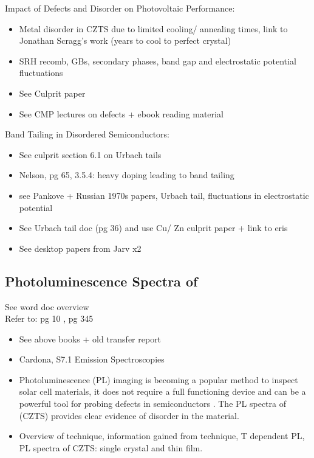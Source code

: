 Impact of Defects and Disorder on Photovoltaic Performance:
\begin{itemize}
\item Metal disorder in CZTS due to limited cooling/ annealing times, link to Jonathan Scragg's work (years to cool to perfect crystal)
\item SRH recomb, GBs, secondary phases, band gap and electrostatic potential fluctuations
\item See Culprit paper
\item See CMP lectures on defects + ebook reading material 
\end{itemize}

Band Tailing in Disordered Semiconductors:
\begin{itemize}
\item See culprit section 6.1 on Urbach tails
\item Nelson, pg 65, 3.5.4: heavy doping leading to band tailing
\item see Pankove + Russian 1970s papers, Urbach tail, fluctuations in electrostatic potential
\item See Urbach tail doc (pg 36) and use Cu/ Zn culprit paper + link to eris
\item See desktop papers from Jarv x2
\end{itemize}


\subsection{Photoluminescence Spectra of \CZTS}\label{CZTS_PL_section}
See word doc overview\\

Refer to: pg 10 \cite{spatial_resolved_book}, pg 345 \cite{fund_semi}\\

\begin{itemize}
\item See above books + old transfer report
\item Cardona, S7.1 Emission Spectroscopies
\item Photoluminescence (PL) imaging is becoming a popular method to inspect solar cell materials, it does not require a full functioning device and can be a powerful tool for probing defects in semiconductors \cite{characterization_book, Gerschon}. The PL spectra of \CZTS (CZTS) provides clear evidence of disorder in the material.
\item Overview of technique, information gained from technique, T dependent PL, PL spectra of CZTS: single crystal and thin film.
\end{itemize}


